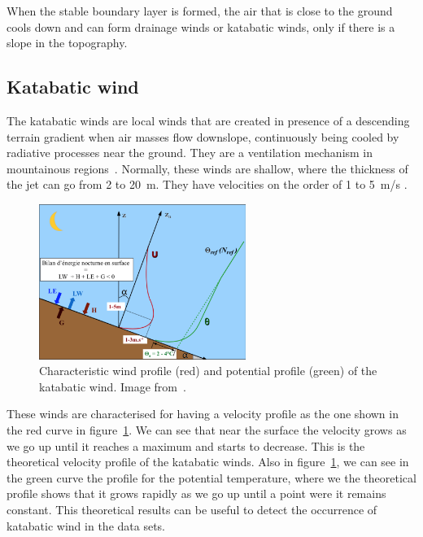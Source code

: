 \documentclass[a4paper,12pt]{article}
\begin{document}
When the stable boundary layer is formed, the air that is close to the ground cools down and can form drainage winds or katabatic winds, only if there is a slope in the topography.

\subsection{Katabatic wind}

The katabatic winds are local winds that are created in presence of a descending terrain gradient when air masses flow downslope, continuously being cooled by radiative processes near the ground. They are a ventilation mechanism in mountainous regions~\citep{manins1979model}. Normally, these winds are shallow, where the thickness of the jet can go from 2 to 20~m. They have velocities on the order of 1 to 5~m/s \citep{stull2012introduction}. 

\begin{figure}[ht!]
	\vspace{-5pt}
    \centering
\includegraphics[width=0.6\textwidth]{fig/profiles_katabatic_wind.png}
    \caption{Characteristic wind profile (red) and potential profile (green) of the katabatic wind. Image from~\cite{claudine}.}
    \label{fig:u_profile}
  \vspace{-5pt}
\end{figure}

These winds are characterised for having a velocity profile as the one shown in the red curve in figure~\ref{fig:u_profile}. We can see that near the surface the velocity grows as we go up until it reaches a maximum and starts to decrease. This is the theoretical velocity profile of the katabatic winds. Also in figure~\ref{fig:u_profile}, we can see in the green curve the profile for the potential temperature, where we the theoretical profile shows that it grows rapidly as we go up until a point were it remains constant. This theoretical results can be useful to detect the occurrence of katabatic wind in the data sets.
\end{document}
